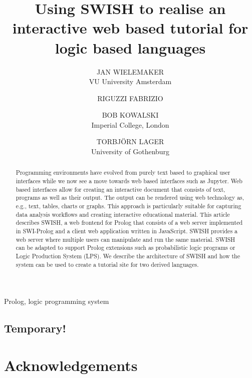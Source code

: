 \documentclass{tlp}
\begin{document}


\title{Using SWISH to realise an interactive web based
       tutorial for logic based languages}

\author[J. Wielemaker et al.]
{JAN WIELEMAKER \\
VU University Amsterdam\\
\and
RIGUZZI FABRIZIO \\
\and
BOB KOWALSKI \\
Imperial College, London\\
\and
TORBJ\"ORN LAGER \\
University of Gothenburg\\
}

\pagerange{\pageref{firstpage}--\pageref{lastpage}}
\setcounter{page}{1}

\maketitle
\begin{abstract}
Programming environments have evolved from purely text based to
graphical user interfaces while we now see a move towards web based
interfaces such as Jupyter. Web based interfaces allow for creating an
interactive document that consists of text, programs as well as their
output. The output can be rendered using web technology as, e.g., text,
tables, charts or graphs. This approach is particularly suitable for
capturing data analysis workflows and creating interactive educational
material. This article describes SWISH, a web frontend for Prolog that
consists of a web server implemented in SWI-Prolog and a client web
application written in JavaScript. SWISH provides a web server where
multiple users can manipulate and run the same material. SWISH can be
adapted to support Prolog extensions such as probabilistic logic
programs or Logic Production System (LPS). We describe the architecture
of SWISH and how the system can be used to create a tutorial site for
two derived languages.
\end{abstract}


\begin{keywords}
Prolog, logic programming system
\end{keywords}

\newpage
\subsection*{Temporary!}
\tableofcontents
\newpage







\section*{Acknowledgements}


\end{document}
